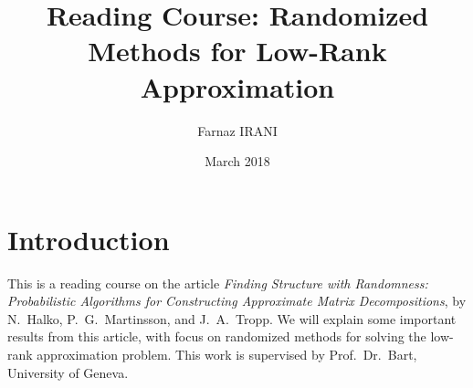 \documentclass{article}
\title{Reading Course: Randomized Methods for Low-Rank Approximation}
\author{Farnaz IRANI}
\date{March 2018}
\begin{document}
\maketitle

\section{Introduction}
This is a reading course on the article \textit{Finding Structure with Randomness: Probabilistic Algorithms for Constructing Approximate Matrix Decompositions}, by N.~Halko, P.~G.~Martinsson, and J.~A.~Tropp.
We will explain some important results from this article, with focus on randomized methods for solving the low-rank approximation problem. This work is supervised by Prof.~Dr.~Bart, University of Geneva.



\end{document}
